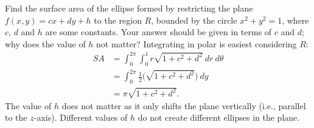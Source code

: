 {Find the surface area of the ellipse formed by restricting the plane $f(x,y) = cx+dy+h$ to the region $R$, bounded by the circle $x^2+y^2=1$, where $c$, $d$ and $h$ are some constants. Your answer should be given in terms of $c$ and $d$; why does the value of $h$ not matter?
}
{Integrating in polar is easiest considering $R$:
\begin{align*}SA &= \int_{0}^{2\pi}\int_{0}^{1} r\sqrt{1+ c^2+d^2}\ dr\ d\theta\\
		&= \int_0^{2\pi}\frac12\Big(\sqrt{1+c^2+d^2}\Big)\ dy \\
		&= \pi\sqrt{1+c^2+d^2}.
\end{align*}
The value of $h$ does not matter as it only shifts the plane vertically (i.e., parallel to the $z$-axis). Different values of $h$ do not create different ellipses in the plane.
}